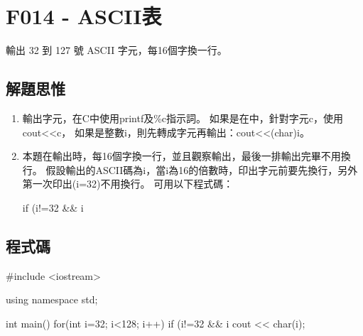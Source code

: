 \section{F014 - ASCII表}
輸出 32 到 127 號 ASCII 字元，每16個字換一行。
\subsection{解題思惟}
\begin{enumerate}
\item 輸出字元，在C中使用printf及\%c指示詞。
如果是在\cc{}中，針對字元c，使用cout<<c，
如果是整數i，則先轉成字元再輸出：cout<<(char)i。
\item 本題在輸出時，每16個字換一行，並且觀察輸出，最後一排輸出完畢不用換行。
假設輸出的ASCII碼為i，當i為16的倍數時，印出字元前要先換行，另外第一次印出(i=32)不用換行。
可用以下程式碼：
\begin{inside}
if (i!=32 && i%
\end{inside}
\end{enumerate}

\subsection{程式碼}
\begin{cppcode}
#include <iostream>

using namespace std;

int main()
{
	for(int i=32; i<128; i++)
	{
		if (i!=32 && i%
		cout << char(i);
	}
}
\end{cppcode}
